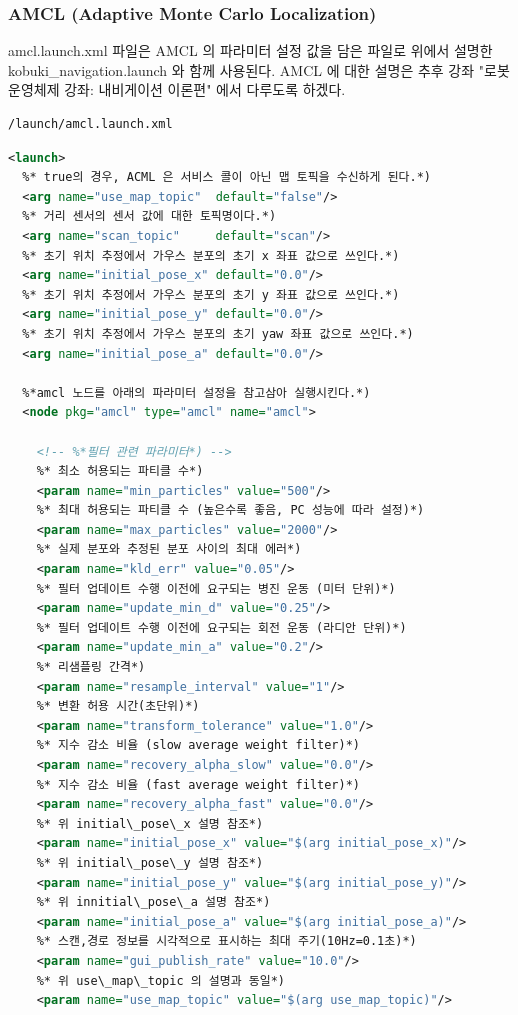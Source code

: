 \subsubsection{AMCL (Adaptive Monte Carlo Localization)}
amcl.launch.xml 파일은 AMCL 의 파라미터 설정 값을 담은 파일로 위에서 설명한 kobuki\_navigation.launch 와 함께 사용된다. AMCL 에 대한 설명은 추후 강좌 "로봇 운영체제 강좌: 내비게이션 이론편" 에서 다루도록 하겠다.

\vspace{\baselineskip}
\begin{lstlisting}[language=ROS]
/launch/amcl.launch.xml
\end{lstlisting}

\vspace{\baselineskip}
\begin{lstlisting}[language=XML]
<launch>
  %* true의 경우, ACML 은 서비스 콜이 아닌 맵 토픽을 수신하게 된다.*)
  <arg name="use_map_topic"  default="false"/>
  %* 거리 센서의 센서 값에 대한 토픽명이다.*) 
  <arg name="scan_topic"     default="scan"/>
  %* 초기 위치 추정에서 가우스 분포의 초기 x 좌표 값으로 쓰인다.*)
  <arg name="initial_pose_x" default="0.0"/>
  %* 초기 위치 추정에서 가우스 분포의 초기 y 좌표 값으로 쓰인다.*)
  <arg name="initial_pose_y" default="0.0"/> 
  %* 초기 위치 추정에서 가우스 분포의 초기 yaw 좌표 값으로 쓰인다.*)
  <arg name="initial_pose_a" default="0.0"/> 

  %*amcl 노드를 아래의 파라미터 설정을 참고삼아 실행시킨다.*)
  <node pkg="amcl" type="amcl" name="amcl"> 

    <!-- %*필터 관련 파라미터*) -->
    %* 최소 허용되는 파티클 수*)
    <param name="min_particles" value="500"/> 
    %* 최대 허용되는 파티클 수 (높은수록 좋음, PC 성능에 따라 설정)*)
    <param name="max_particles" value="2000"/>
    %* 실제 분포와 추정된 분포 사이의 최대 에러*)
    <param name="kld_err" value="0.05"/>
    %* 필터 업데이트 수행 이전에 요구되는 병진 운동 (미터 단위)*)
    <param name="update_min_d" value="0.25"/>
    %* 필터 업데이트 수행 이전에 요구되는 회전 운동 (라디안 단위)*)
    <param name="update_min_a" value="0.2"/>
    %* 리샘플링 간격*)
    <param name="resample_interval" value="1"/>
    %* 변환 허용 시간(초단위)*)
    <param name="transform_tolerance" value="1.0"/>
    %* 지수 감소 비율 (slow average weight filter)*)
    <param name="recovery_alpha_slow" value="0.0"/>
    %* 지수 감소 비율 (fast average weight filter)*)
    <param name="recovery_alpha_fast" value="0.0"/> 
    %* 위 initial\_pose\_x 설명 참조*)
    <param name="initial_pose_x" value="$(arg initial_pose_x)"/>
    %* 위 initial\_pose\_y 설명 참조*)
    <param name="initial_pose_y" value="$(arg initial_pose_y)"/>
    %* 위 innitial\_pose\_a 설명 참조*)
    <param name="initial_pose_a" value="$(arg initial_pose_a)"/>
    %* 스캔,경로 정보를 시각적으로 표시하는 최대 주기(10Hz=0.1초)*)
    <param name="gui_publish_rate" value="10.0"/> 
    %* 위 use\_map\_topic 의 설명과 동일*)
    <param name="use_map_topic" value="$(arg use_map_topic)"/> 


\end{lstlisting}
